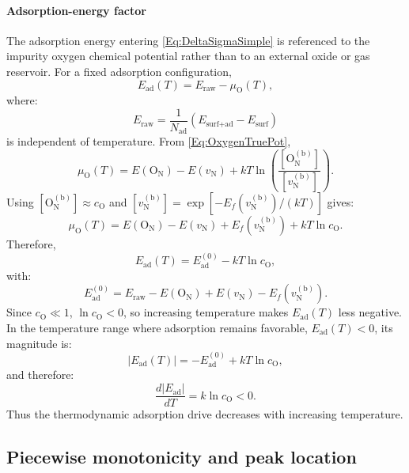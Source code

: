 \documentclass[preprint,12pt,sort&compress]{elsarticle}
\newcommand{\?}{\stackrel{?}{=}}
\begin{document}
\paragraph{Adsorption-energy factor} The adsorption energy entering \cref{Eq:DeltaSigmaSimple} is referenced to the impurity oxygen chemical potential rather than to an external oxide or gas reservoir. For a fixed adsorption configuration,
\begin{equation}
E_\text{ad}(T) = E_\text{raw} - \mu_\text{O}(T),
\end{equation}
where:
\begin{equation}
E_\text{raw} = \frac{1}{N_\text{ad}} \left( E_\text{surf+ad} - E_\text{surf} \right)
\end{equation}
is independent of temperature. From \cref{Eq:OxygenTruePot},
\begin{equation}
\mu_\text{O}(T) = E(\text{O}_\text{N}) - E(v_\text{N}) + kT \ln\left( \frac{ [\text{O}_\text{N}^{(\text{b})}] } { [v_\text{N}^{(\text{b})}] } \right).
\end{equation}
Using $[\text{O}_\text{N}^{(\text{b})}]\approx c_\text{O}$ and $[v_\text{N}^{(\text{b})}] = \exp[-E_f(v_\text{N}^{(\text{b})})/(kT)]$ gives:
\begin{equation}
\mu_\text{O}(T) = E(\text{O}_\text{N}) - E(v_\text{N}) + E_f(v_\text{N}^{(\text{b})}) + kT \ln c_\text{O}.
\label{Eq:App:muOimp}
\end{equation}
Therefore,
\begin{equation}
E_\text{ad}(T) = E_\text{ad}^{(0)} - kT \ln c_\text{O},
\label{Eq:App:EadImpExplicit}
\end{equation}
with:
\begin{equation}
E_\text{ad}^{(0)} = E_\text{raw} - E(\text{O}_\text{N}) + E(v_\text{N}) - E_f(v_\text{N}^{(\text{b})}).
\end{equation}
Since $c_\text{O}\ll1$, $\ln c_\text{O}<0$, so increasing temperature makes $E_\text{ad}(T)$ less negative. In the temperature range where adsorption remains favorable, $E_\text{ad}(T)<0$, its magnitude is:
\begin{equation}
|E_\text{ad}(T)| = - E_\text{ad}^{(0)} + kT \ln c_\text{O},
\end{equation}
and therefore:
\begin{equation}
\frac{d|E_\text{ad}|}{dT} = k\ln c_\text{O} < 0.
\end{equation}
Thus the thermodynamic adsorption drive decreases with increasing temperature.

\subsection{Piecewise monotonicity and peak location}
\label{App:Tpeak:Monotonicity}
\end{document}
